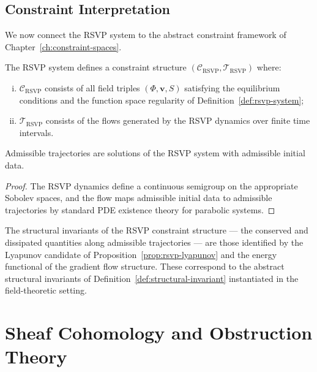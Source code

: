 \documentclass[11pt,openany]{book}
\begin{document}
\section{Constraint Interpretation}
\label{sec:constraint-interpretation}

We now connect the RSVP system to the abstract constraint
framework of Chapter~\ref{ch:constraint-spaces}.

\begin{proposition}
\label{prop:rsvp-as-constraint-app}
The RSVP system defines a constraint structure
$(\mathcal{C}_{\mathrm{RSVP}}, \mathcal{T}_{\mathrm{RSVP}})$
where:
\begin{enumerate}[(i)]
  \item $\mathcal{C}_{\mathrm{RSVP}}$ consists of all
    field triples $(\Phi, \boldsymbol{v}, S)$ satisfying
    the equilibrium conditions and the function space
    regularity of Definition~\ref{def:rsvp-system};
  \item $\mathcal{T}_{\mathrm{RSVP}}$ consists of the
    flows generated by the RSVP dynamics over finite time
    intervals.
\end{enumerate}
Admissible trajectories are solutions of the RSVP system
with admissible initial data.
\end{proposition}

\begin{proof}
The RSVP dynamics define a continuous semigroup on the
appropriate Sobolev spaces, and the flow maps admissible
initial data to admissible trajectories by standard PDE
existence theory for parabolic systems.
\end{proof}

The structural invariants of the RSVP constraint structure
— the conserved and dissipated quantities along admissible
trajectories — are those identified by the Lyapunov
candidate of Proposition~\ref{prop:rsvp-lyapunov} and the
energy functional of the gradient flow structure.  These
correspond to the abstract structural invariants of
Definition~\ref{def:structural-invariant} instantiated in
the field-theoretic setting.


\chapter{Sheaf Cohomology and Obstruction Theory}
\label{app:sheaves}
\end{document}

